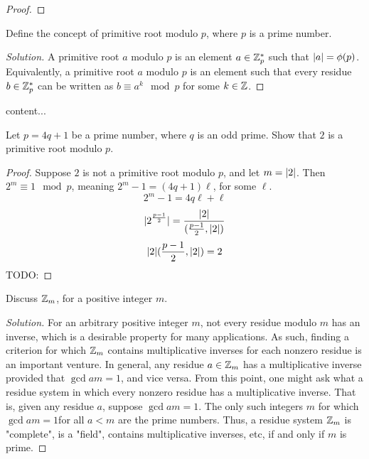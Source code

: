 \documentclass[11pt]{article}
\begin{document}
\begin{proof}

\end{proof}

\begin{exercise}{8}
Define the concept of primitive root modulo $ p $, where $ p $ is a prime number.
\end{exercise}

\begin{proof}[Solution]
A primitive root $ a $ modulo $ p $ is an element $ a \in \mathbb{Z}_{p}^{*} $ such that $ |a| = \phi(p) $. Equivalently, a primitive root $ a $ modulo $ p $ is an element such that every residue $ b \in \mathbb{Z}_{p}^{*} $ can be written as $ b \equiv a^{k} \mod p$ for some $ k \in \mathbb{Z} $.
\end{proof}

\begin{exercise}{9}
content...
\end{exercise}

\begin{exercise}{9}
Let $ p = 4q + 1$ be a prime number, where $ q $ is an odd prime. Show that $ 2 $ is a primitive root modulo $ p $.
\end{exercise}

\begin{proof}
Suppose $ 2 $ is not a primitive root modulo $ p $, and let $ m = |2| $. Then $ 2^{m} \equiv 1 \mod p $, meaning $ 2^{m} - 1 = (4q + 1) \ell $, for some $ \ell $. 
\[ 2^{m} - 1 = 4q \ell + \ell \]
\[ |2^{\frac{p-1}{2}}| = \frac{|2|}{(\frac{p-1}{2}, |2|)} \]
\[ |2| (\frac{p-1}{2}, |2|) = 2\]
TODO:
\end{proof}

\begin{exercise}{10}
Discuss $ \mathbb{Z}_{m} $, for a positive integer $ m $.
\end{exercise}

\begin{proof}[Solution]
For an arbitrary positive integer $ m $, not every residue modulo $ m $ has an inverse, which is a desirable property for many applications. As such, finding a criterion for which $ \mathbb{Z}_{m} $ contains multiplicative inverses for each nonzero residue is an important venture. In general, any residue $ a \in \mathbb{Z}_{m} $ has a multiplicative inverse provided that $ \gcd{a}{m} = 1 $, and vice versa. From this point, one might ask what a residue system in which every nonzero residue has a multiplicative inverse. That is, given any residue $ a $, suppose $ \gcd{a}{m} = 1 $. The only such integers $ m $ for which $ \gcd{a}{m}  = 1 $for all $ a < m $ are the prime numbers. Thus, a residue system $ \mathbb{Z}_{m} $ is "complete", is a "field", contains multiplicative inverses, etc, if and only if $ m $ is prime.
\end{proof}
\end{document}
